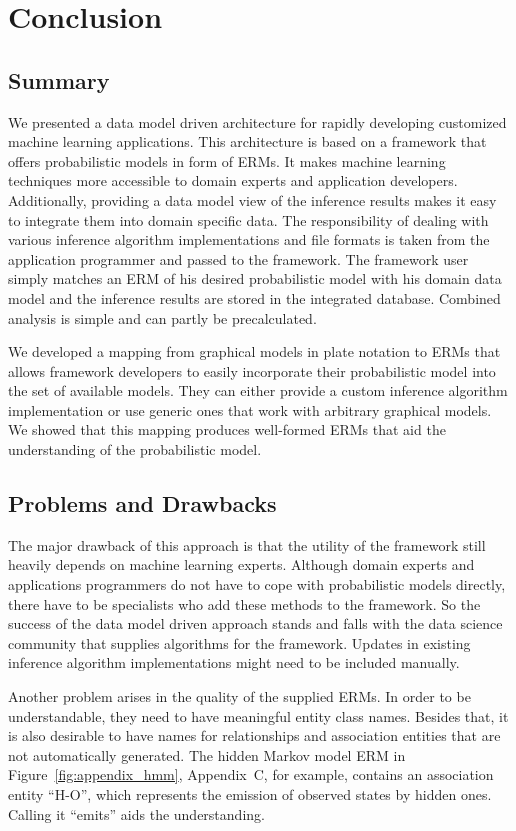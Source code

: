 \section{Conclusion}

\subsection{Summary}

We presented a data model driven architecture for rapidly developing customized machine learning applications. This architecture is based on a framework that offers probabilistic models in form of ERMs. It makes machine learning techniques more accessible to domain experts and application developers. Additionally, providing a data model view of the inference results makes it easy to integrate them into domain specific data. The responsibility of dealing with various inference algorithm implementations and file formats is taken from the application programmer and passed to the framework. The framework user simply matches an ERM of his desired probabilistic model with his domain data model and the inference results are stored in the integrated database. Combined analysis is simple and can partly be precalculated.

We developed a mapping from graphical models in plate notation to ERMs that allows framework developers to easily incorporate their probabilistic model into the set of available models. They can either provide a custom inference algorithm implementation or use generic ones that work with arbitrary graphical models. We showed that this mapping produces well-formed ERMs that aid the understanding of the probabilistic model.

\subsection{Problems and Drawbacks}

The major drawback of this approach is that the utility of the framework still heavily depends on machine learning experts. Although domain experts and applications programmers do not have to cope with probabilistic models directly, there have to be specialists who add these methods to the framework. So the success of the data model driven approach stands and falls with the data science community that supplies algorithms for the framework. Updates in existing inference algorithm implementations might need to be included manually.

Another problem arises in the quality of the supplied ERMs. In order to be understandable, they need to have meaningful entity class names. Besides that, it is also desirable to have names for relationships and association entities that are not automatically generated. The hidden Markov model ERM in Figure~\ref{fig:appendix_hmm}, Appendix~C, for example, contains an association entity ``H-O'', which represents the emission of observed states by hidden ones. Calling it ``emits'' aids the understanding.

